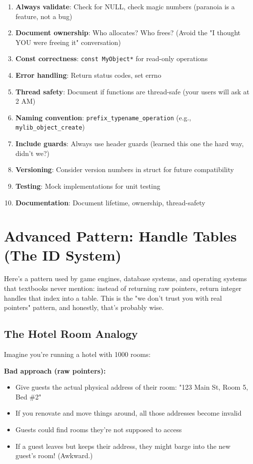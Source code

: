 \begin{enumerate}
    \item \textbf{Always validate}: Check for NULL, check magic numbers (paranoia is a feature, not a bug)
    \item \textbf{Document ownership}: Who allocates? Who frees? (Avoid the "I thought YOU were freeing it" conversation)
    \item \textbf{Const correctness}: \texttt{const MyObject*} for read-only operations
    \item \textbf{Error handling}: Return status codes, set errno
    \item \textbf{Thread safety}: Document if functions are thread-safe (your users will ask at 2 AM)
    \item \textbf{Naming convention}: \texttt{prefix\_typename\_operation} (e.g., \texttt{mylib\_object\_create})
    \item \textbf{Include guards}: Always use header guards (learned this one the hard way, didn't we?)
    \item \textbf{Versioning}: Consider version numbers in struct for future compatibility
    \item \textbf{Testing}: Mock implementations for unit testing
    \item \textbf{Documentation}: Document lifetime, ownership, thread-safety
\end{enumerate}

\section{Advanced Pattern: Handle Tables (The ID System)}

Here's a pattern used by game engines, database systems, and operating systems that textbooks never mention: instead of returning raw pointers, return integer handles that index into a table. This is the "we don't trust you with real pointers" pattern, and honestly, that's probably wise.

\subsection*{The Hotel Room Analogy}

Imagine you're running a hotel with 1000 rooms:

\textbf{Bad approach (raw pointers):}
\begin{itemize}
    \item Give guests the actual physical address of their room: "123 Main St, Room 5, Bed \#2"
    \item If you renovate and move things around, all those addresses become invalid
    \item Guests could find rooms they're not supposed to access
    \item If a guest leaves but keeps their address, they might barge into the new guest's room! (Awkward.)
\end{itemize}

